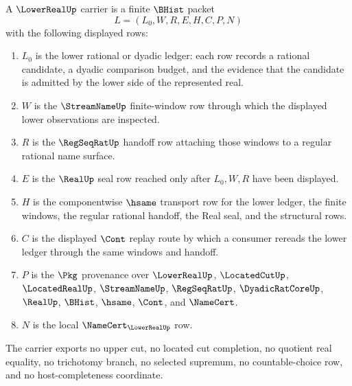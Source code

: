 \begin{definition}
\label{def:lower-real-carrier}
A $\LowerRealUp$ carrier is a finite $\BHist$ packet
$$
L=(L_0,W,R,E,H,C,P,N)
$$
with the following displayed rows:
\begin{enumerate}
\item $L_0$ is the lower rational or dyadic ledger: each row records a rational candidate, a dyadic comparison budget, and the evidence that the candidate is admitted by the lower side of the represented real.
\item $W$ is the $\StreamNameUp$ finite-window row through which the displayed lower observations are inspected.
\item $R$ is the $\RegSeqRatUp$ handoff row attaching those windows to a regular rational name surface.
\item $E$ is the $\RealUp$ seal row reached only after $L_0,W,R$ have been displayed.
\item $H$ is the componentwise $\hsame$ transport row for the lower ledger, the finite windows, the regular rational handoff, the Real seal, and the structural rows.
\item $C$ is the displayed $\Cont$ replay route by which a consumer rereads the lower ledger through the same windows and handoff.
\item $P$ is the $\Pkg$ provenance over $\LowerRealUp$, $\LocatedCutUp$, $\LocatedRealUp$, $\StreamNameUp$, $\RegSeqRatUp$, $\DyadicRatCoreUp$, $\RealUp$, $\BHist$, $\hsame$, $\Cont$, and $\NameCert$.
\item $N$ is the local $\NameCert_{\LowerRealUp}$ row.
\end{enumerate}
The carrier exports no upper cut, no located cut completion, no quotient real equality, no trichotomy branch, no selected supremum, no countable-choice row, and no host-completeness coordinate.
\end{definition}

